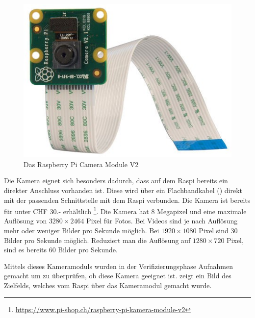 \begin{figure}
    \centering
    \includegraphics[width=0.5\linewidth]{pics/raspi-cam.jpg}
    \caption{Das Raspberry Pi Camera Module V2}
    \label{fig:raspi-cam}
\end{figure}


Die Kamera eignet sich besonders dadurch, dass auf dem Raspi bereits ein direkter Anschluss vorhanden ist. Diese wird über ein Flachbandkabel () direkt mit der passenden Schnittstelle mit dem Raspi verbunden. Die Kamera ist bereits für unter CHF 30.- erhältlich \footnote{\url{https://www.pi-shop.ch/raspberry-pi-kamera-module-v2}}. Die Kamera hat $8$ Megapixel und eine maximale Auflösung von $3280 \times 2464$ Pixel für Fotos. Bei Videos sind je nach Auflösung mehr oder weniger Bilder pro Sekunde möglich. Bei $1920 \times 1080$ Pixel sind $30$ Bilder pro Sekunde möglich. Reduziert man die Auflösung auf $1280 \times 720$ Pixel, sind es bereits $60$ Bilder pro Sekunde.

Mittels dieses Kameramoduls wurden in der Verifizierungsphase Aufnahmen gemacht um zu überprüfen, ob diese Kamera geeignet ist.  zeigt ein Bild des Zielfelds, welches vom Raspi über das Kameramodul gemacht wurde.

